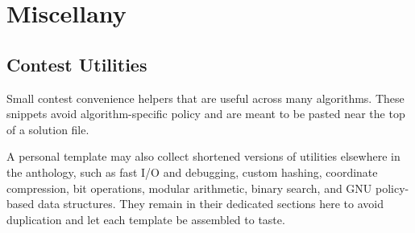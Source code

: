 \chapter{\texorpdfstring{Miscellany}{8. Miscellany}}

\section{\texorpdfstring{Contest Utilities}{8.1 Contest Utilities}}
\setcounter{section}{1}
\label{sec:8.1}
Small contest convenience helpers that are useful across many algorithms. These snippets avoid algorithm-specific policy and are meant to be pasted near the top of a solution file.

A personal template may also collect shortened versions of utilities elsewhere in the anthology, such as fast I/O and debugging, custom hashing, coordinate compression, bit operations, modular arithmetic, binary search, and GNU policy-based data structures. They remain in their dedicated sections here to avoid duplication and let each template be assembled to taste.

